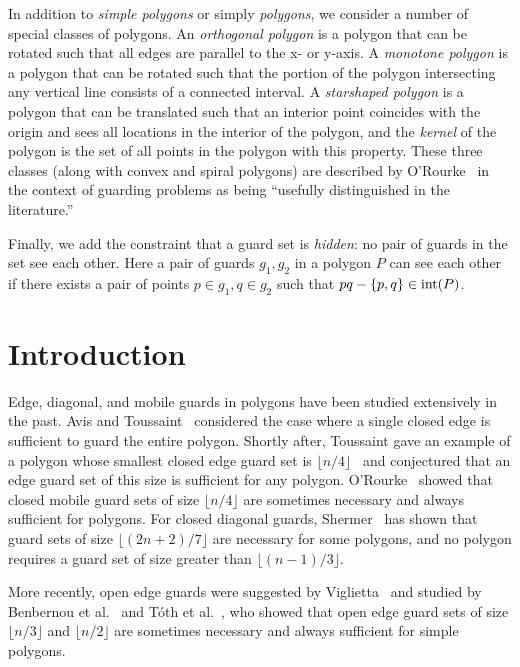 \documentclass{cccg12}
\begin{document}
In addition to \emph{simple polygons} or simply \emph{polygons}, we consider a number of special classes of polygons.
An \emph{orthogonal polygon} is a polygon that can be rotated such that all edges are parallel to the x- or y-axis.
A \emph{monotone polygon} is a polygon that can be rotated such that the portion of the polygon intersecting any vertical line consists of a connected interval.
A \emph{starshaped polygon} is a polygon that can be translated such that an interior point coincides with the origin and sees all locations in the interior of the polygon, and the \emph{kernel} of the polygon is the set of all points in the polygon with this property.
These three classes (along with convex and spiral polygons) are described by O'Rourke~\cite{ORourke-1987} in the context of guarding problems as being ``usefully distinguished in the literature.''

Finally, we add the constraint that a guard set is \emph{hidden}: no pair of guards in the set see each other.
Here a pair of guards $g_1, g_2$ in a polygon $P$ can see each other if there exists a pair of points $p \in g_1, q \in g_2$ such that $pq - \{p,q\} \in {\rm int}(P)$.

\section{Introduction}

Edge, diagonal, and mobile guards in polygons have been studied extensively in the past.
Avis and Toussaint~\cite{Avis-1981} considered the case where a single closed edge is sufficient to guard the entire polygon.
Shortly after, Toussaint gave an example of a polygon whose smallest closed edge guard set is $\lfloor n/4 \rfloor$~\cite{ORourke-1983} and conjectured that an edge guard set of this size is sufficient for any polygon.
O'Rourke~\cite{ORourke-1983} showed that closed mobile guard sets of size $\lfloor n/4 \rfloor$ are sometimes necessary and always sufficient for polygons.
For closed diagonal guards, Shermer~\cite{Shermer-1992} has shown that guard sets of size $\lfloor (2n + 2)/7 \rfloor$ are necessary for some polygons, and no polygon requires a guard set of size greater than $\lfloor (n-1)/3 \rfloor$.

More recently, open edge guards were suggested by Viglietta~\cite{Viglietta-2011} and studied by Benbernou et al.~\cite{Benbernou-2011} and T\'{o}th et al.~\cite{Toth-2011}, who showed that open edge guard sets of size $\lfloor n/3 \rfloor$ and $\lfloor n/2 \rfloor$ are sometimes necessary and always sufficient for simple polygons. 
\end{document}
